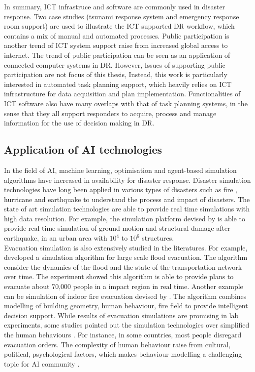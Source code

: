 In summary, \ac{ICT} infrastruce and software are commonly used in disaster response. Two case studies (tsunami response system and emergency response room support) are used to illustrate the \ac{ICT} supported \ac{DR} workflow, which contains a mix of manual and automated processes. Public participation is another trend of \ac{ICT} system support raise from increased global access to internet. The trend of public participation can be seen as an application of connected computer systems in \ac{DR}. However, Issues of supporting public participation are not focus of this thesis, Instead, this work is particularly interested in automated task planning support, which heavily relies on \ac{ICT} infrastructure for data acquisition and plan implementation. Functionalities of \ac{ICT} software also have many overlaps with that of task planning systems, in the sense that they all support responders to acquire, process and manage information for the use of decision making in \ac{DR}. \\


\subsection{Application of AI technologies}\label{sec:lraisupport}
In the field of \ac{AI}, machine learning, optimisation and agent-based simulation algorithms have increased in availability for disaster response. Disaster simulation technologies \cite{Okaya,Scerri2005} have long been applied in various types of disasters such as fire \cite{Tang2012}, hurricane \cite{Vickery2009} and earthquake\cite{Sobhaninejad2011} to understand the process and impact of disasters. The state of art simulation technologies are able to provide real time simulations with high data resolution. For example, the simulation platform devised by \cite{Sobhaninejad2011} is able to provide real-time simulation of ground motion and structural damage after earthquake, in an urban area with $10^{4}$ to $10^{6}$ structures. \\

Evacuation simulation is also extensively studied in the literatures. For example, \cite{Pillac2015} developed a simulation algorithm for large scale flood evacuation. The algorithm consider the dynamics of the flood and the state of the transportation network over time. The experiment showed this algorithm is able to provide plans to evacuate about 70,000 people in a impact region in real time.  Another example can be simulation of indoor fire evacuation devised by \cite{Tang2012}.  The algorithm combines modelling of building geometry, human behaviour, fire field to provide intelligent decision support. While results of evacuation simulations are promising in lab experiments, some studies pointed out the simulation technologies over simplified the human behaviours \cite{Hentenryck2011}. For instance, in some countries, most people disregard evacuation orders. The complexity of human behaviour raise from cultural, political, psychological factors, which makes behaviour modelling a challenging topic for \ac{AI} community \cite{Provitolo2011} . \\

